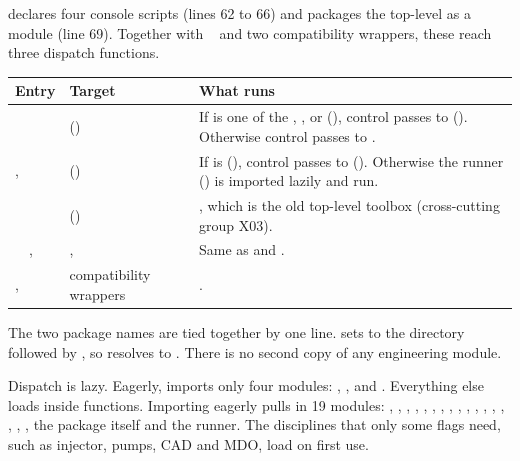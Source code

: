  declares four console scripts (lines 62 to 66) and packages the top-level  as a module (line 69). Together with ~ and two compatibility wrappers, these reach three dispatch functions.

{\small
\begin{longtable}{P{3.5cm}P{4.2cm}P{7.8cm}}
\toprule
Entry & Target & What runs \\
\midrule
\endhead
{} &  () & If  is one of the  , ,  or  (), control passes to  (). Otherwise control passes to . \\
,  &  () & If  is  (), control passes to  (). Otherwise the runner  () is imported lazily and run. \\
 &  () & , which is the old top-level  toolbox (cross-cutting group X03). \\
~~, ~~ & ,  & Same as  and . \\
,  & compatibility wrappers & . \\
\bottomrule
\end{longtable}}

The two package names are tied together by one line.  sets  to the  directory followed by , so  resolves to . There is no second copy of any engineering module.

Dispatch is lazy. Eagerly,  imports only four modules: , ,  and . Everything else loads inside functions. Importing  eagerly pulls in 19 modules: , , , , , , , , , , , , , , , , , the  package itself and the runner. The disciplines that only some flags need, such as injector, pumps, CAD and MDO, load on first use.

